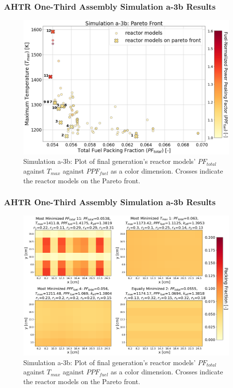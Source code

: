 \begin{frame}
    \frametitle{AHTR One-Third Assembly Simulation a-3b Results}
    \begin{figure}
        \includegraphics[width=0.8\linewidth]{../docs/figures/assem-obj-3-all-2d.png} 
        \caption{Simulation a-3b: Plot of final generation's reactor models' 
        $PF_{total}$ against $T_{max}$ against $PPF_{fuel}$ as a color dimension. 
        Crosses indicate the reactor models on the Pareto front.}
    \end{figure}
\end{frame}

\begin{frame}
    \frametitle{AHTR One-Third Assembly Simulation a-3b Results}
    \begin{figure}
        \includegraphics[width=0.8\linewidth]{../docs/figures/assem-obj-3-all-distr-most-minimized.png} 
        \caption{Simulation a-3b: Plot of final generation's reactor models' 
        $PF_{total}$ against $T_{max}$ against $PPF_{fuel}$ as a color dimension. 
        Crosses indicate the reactor models on the Pareto front.}
    \end{figure}
\end{frame}

